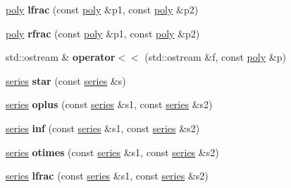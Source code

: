 \begin{DoxyCompactItemize}
\mbox{\hyperlink{classetvo_i_i_1_1poly}{poly}} {\bfseries lfrac} (const \mbox{\hyperlink{classetvo_i_i_1_1poly}{poly}} \&p1, const \mbox{\hyperlink{classetvo_i_i_1_1poly}{poly}} \&p2)
\item 
\mbox{\label{namespaceetvo_i_i_ab16dbe9552d721129224273948698380}} 
\mbox{\hyperlink{classetvo_i_i_1_1poly}{poly}} {\bfseries rfrac} (const \mbox{\hyperlink{classetvo_i_i_1_1poly}{poly}} \&p1, const \mbox{\hyperlink{classetvo_i_i_1_1poly}{poly}} \&p2)
\item 
\mbox{\label{namespaceetvo_i_i_ae73381694ad447297127f8707dc8c9dc}} 
std\+::ostream \& {\bfseries operator$<$$<$} (std\+::ostream \&f, const \mbox{\hyperlink{classetvo_i_i_1_1poly}{poly}} \&p)
\item 
\mbox{\label{namespaceetvo_i_i_a4a07e0774953c691c06d5d9befeb4c9d}} 
\mbox{\hyperlink{classetvo_i_i_1_1series}{series}} {\bfseries star} (const \mbox{\hyperlink{classetvo_i_i_1_1series}{series}} \&s)
\item 
\mbox{\label{namespaceetvo_i_i_ae8c131a518382c7bc93f81f8dbfc0032}} 
\mbox{\hyperlink{classetvo_i_i_1_1series}{series}} {\bfseries oplus} (const \mbox{\hyperlink{classetvo_i_i_1_1series}{series}} \&s1, const \mbox{\hyperlink{classetvo_i_i_1_1series}{series}} \&s2)
\item 
\mbox{\label{namespaceetvo_i_i_ac2fcda9ca5a65e6d84b7a885764204e6}} 
\mbox{\hyperlink{classetvo_i_i_1_1series}{series}} {\bfseries inf} (const \mbox{\hyperlink{classetvo_i_i_1_1series}{series}} \&s1, const \mbox{\hyperlink{classetvo_i_i_1_1series}{series}} \&s2)
\item 
\mbox{\label{namespaceetvo_i_i_aa477f7194e87531b668e6d1a962516c1}} 
\mbox{\hyperlink{classetvo_i_i_1_1series}{series}} {\bfseries otimes} (const \mbox{\hyperlink{classetvo_i_i_1_1series}{series}} \&s1, const \mbox{\hyperlink{classetvo_i_i_1_1series}{series}} \&s2)
\item 
\mbox{\label{namespaceetvo_i_i_aa3b9dc189f69408fe88b3e9c0cfedf3c}} 
\mbox{\hyperlink{classetvo_i_i_1_1series}{series}} {\bfseries lfrac} (const \mbox{\hyperlink{classetvo_i_i_1_1series}{series}} \&s1, const \mbox{\hyperlink{classetvo_i_i_1_1series}{series}} \&s2)

\end{DoxyCompactItemize}
